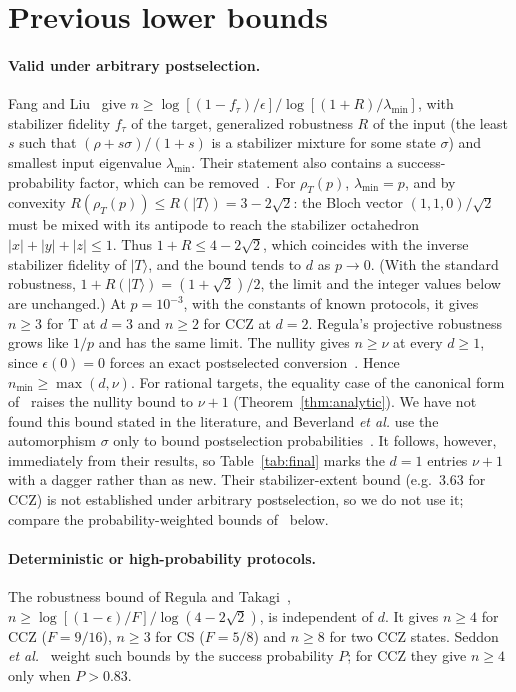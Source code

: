 \documentclass[aps,prl,reprint,twocolumn,amsmath,amssymb,floatfix,nofootinbib,superscriptaddress]{revtex4-2}
\begin{document}
\section{Previous lower bounds}\label{app:prior}
\paragraph*{Valid under arbitrary postselection.}
Fang and Liu~\cite{fangliu,fangliu2} give $n\geq\log[(1-f_\tau)/\epsilon]/\log[(1+R)/\lambda_{\min}]$, with stabilizer fidelity $f_\tau$ of the target, generalized robustness $R$ of the input (the least $s$ such that $(\rho+s\sigma)/(1+s)$ is a stabilizer mixture for some state $\sigma$) and smallest input eigenvalue $\lambda_{\min}$. Their statement also contains a success-probability factor, which can be removed~\cite{regulaprl}. For $\rho_T(p)$, $\lambda_{\min}=p$, and by convexity $R(\rho_T(p))\leq R(|T\rangle)=3-2\sqrt2$: the Bloch vector $(1,1,0)/\sqrt2$ must be mixed with its antipode to reach the stabilizer octahedron $|x|+|y|+|z|\leq1$. Thus $1+R\leq4-2\sqrt2$, which coincides with the inverse stabilizer fidelity of $|T\rangle$, and the bound tends to $d$ as $p\to0$. (With the standard robustness, $1+R(|T\rangle)=(1+\sqrt2)/2$, the limit and the integer values below are unchanged.) At $p=10^{-3}$, with the constants of known protocols, it gives $n\geq3$ for T at $d=3$ and $n\geq2$ for CCZ at $d=2$. Regula's projective robustness~\cite{regulaprl} grows like $1/p$ and has the same limit. The nullity gives $n\geq\nu$ at every $d\geq1$, since $\epsilon(0)=0$ forces an exact postselected conversion~\cite{beverland}. Hence $n_{\min}\geq\max(d,\nu)$. For rational targets, the equality case of the canonical form of~\cite[Theorem~5.3]{beverland} raises the nullity bound to $\nu+1$ (Theorem~\ref{thm:analytic}). We have not found this bound stated in the literature, and Beverland \emph{et al.} use the automorphism $\sigma$ only to bound postselection probabilities~\cite[Proposition~5.8]{beverland}. It follows, however, immediately from their results, so Table~\ref{tab:final} marks the $d=1$ entries $\nu+1$ with a dagger rather than as new. Their stabilizer-extent bound (e.g.\ $3.63$ for CCZ) is not established under arbitrary postselection, so we do not use it; compare the probability-weighted bounds of~\cite{seddon} below.

\paragraph*{Deterministic or high-probability protocols.}
The robustness bound of Regula and Takagi~\cite{regulatakagi}, $n\geq\log[(1-\epsilon)/F]/\log(4-2\sqrt2)$, is independent of $d$. It gives $n\geq4$ for CCZ ($F=9/16$), $n\geq3$ for CS ($F=5/8$) and $n\geq8$ for two CCZ states. Seddon \emph{et al.}~\cite{seddon} weight such bounds by the success probability $P$; for CCZ they give $n\geq4$ only when $P>0.83$.
\end{document}
